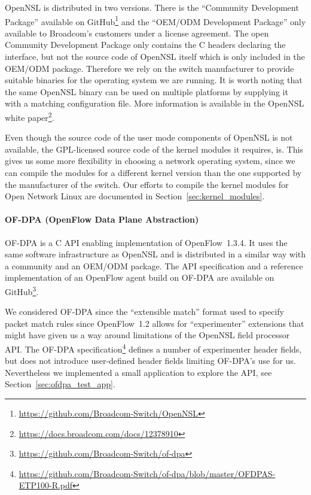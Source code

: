 \documentclass[a4paper]{article}
\begin{document}
OpenNSL is distributed in two versions. There is the ``Community Development Package'' available on GitHub\footnote{\url{https://github.com/Broadcom-Switch/OpenNSL}} and the ``OEM/ODM Development Package'' only available to Broadcom's customers under a license agreement. The open Community Development Package only contains the C headers declaring the interface, but not the source code of OpenNSL itself which is only included in the OEM/ODM package. Therefore we rely on the switch manufacturer to provide suitable binaries for the operating system we are running. It is worth noting that the same OpenNSL binary can be used on multiple platforms by supplying it with a matching configuration file. More information is available in the OpenNSL white paper\footnote{\url{https://docs.broadcom.com/docs/12378910}}.

Even though the source code of the user mode components of OpenNSL is not available, the GPL-licensed source code of the kernel modules it requires, is. This gives us some more flexibility in choosing a network operating system, since we can compile the modules for a different kernel version than the one supported by the manufacturer of the switch. Our efforts to compile the kernel modules for Open Network Linux are documented in Section~\ref{sec:kernel_modules}.

\paragraph{OF-DPA (OpenFlow Data Plane Abstraction)}
OF-DPA is a C API enabling implementation of OpenFlow~1.3.4. It uses the same software infrastructure as OpenNSL and is distributed in a similar way with a community and an OEM/ODM package. The API specification and a reference implementation of an OpenFlow agent build on OF-DPA are available on GitHub\footnote{\url{https://github.com/Broadcom-Switch/of-dpa}}.

We considered OF-DPA since the ``extensible match'' format used to specify packet match rules since OpenFlow~1.2 allows for ``experimenter'' extensions that might have given us a way around limitations of the OpenNSL field processor API. The OF-DPA specification\footnote{\url{https://github.com/Broadcom-Switch/of-dpa/blob/master/OFDPAS-ETP100-R.pdf}} defines a number of experimenter header fields, but does not introduce user-defined header fields limiting OF-DPA's use for us. Nevertheless we implemented a small application to explore the API, see Section~\ref{sec:ofdpa_test_app}.
\end{document}
